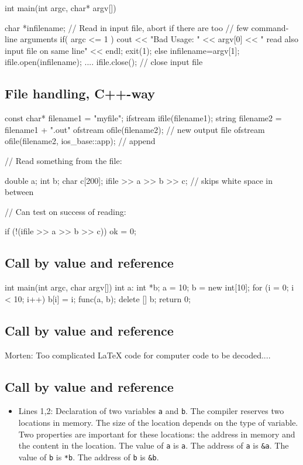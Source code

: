 \documentclass[%
oneside,                 %
final,                   %
10pt]{article}
\begin{document}
{{{{{{{{{{\bcppcod
int main(int argc, char* argv[])
{
  char *infilename;
  // Read in input file, abort if there are too
  // few command-line arguments
  if( argc <= 1 ){
    cout << "Bad Usage: " << argv[0] <<
      " read also input file on same line" << endl;
    exit(1);
  }
  else{
    infilename=argv[1];
  }
  ifile.open(infilename);
  ....
  ifile.close();  // close input file
\ecppcod

\subsection{File handling, C++-way}

\bcppcod
const char* filename1 = "myfile";
ifstream ifile(filename1);
string filename2 = filename1 + ".out"
ofstream ofile(filename2);  // new output file
ofstream ofile(filename2, ios_base::app);  // append

//      Read something from the file:

double a; int b; char c[200];
ifile >> a >> b >> c;  // skips white space in between

//      Can test on success of reading:

if (!(ifile >> a >> b >> c)) ok = 0;
\ecppcod

\subsection{Call by value and reference}

\bcppcod
int main(int argc, char argv[]) {
int  a:
int *b;
a = 10;
b = new int[10];
for (i = 0; i < 10; i++) {
  b[i] = i;
}
func(a, b);
delete [] b;
return 0;
}
\ecppcod

\subsection{Call by value and reference}

Morten: Too complicated {\LaTeX} code for computer code to be
decoded....

\subsection{Call by value and reference}

\begin{itemize}
  \item Lines 1,2: Declaration of two variables \Verb!a! and \Verb!b!. The compiler reserves two locations in memory. The size of the location depends on the type of variable. Two properties are important for these locations: the address in memory and the content in the location. The value of \Verb!a! is \Verb!a!. The address of \Verb!a! is \Verb!&a!. The value of \Verb!b! is \Verb!*b!. The address of \Verb!b! is \Verb!&b!.


\end{itemize}}}}}}}}}}}}
\end{document}
